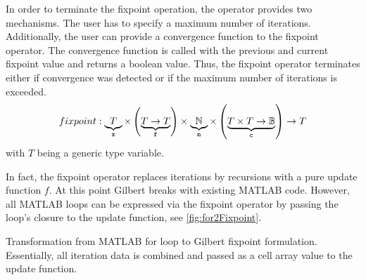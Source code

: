 In order to terminate the fixpoint operation, the operator provides two mechanisms.
The user has to specify a maximum number  of iterations.
Additionally, the user can provide a convergence function  to the fixpoint operator.
The convergence function is called with the previous and current fixpoint value and returns a boolean value.
Thus, the fixpoint operator terminates either if convergence was detected or if the maximum number of iterations is exceeded.
\small
\begin{equation}
\label{eq:fixpoint}
fixpoint: \underbrace{T}_{\text{\texttt{x}}} \times \left( \underbrace{T \rightarrow T}_{\text{\texttt{f}}} \right) \times \underbrace{\mathbb{N}}_{\text{\texttt{m}}} \times \left(\underbrace{T\times T \rightarrow \mathbb{B}}_{\text{\texttt{c}}} \right) \rightarrow T
\end{equation}
\normalsize
with $T$ being a generic type variable.

In fact, the fixpoint operator replaces iterations by recursions with a pure update function $f$. 
At this point Gilbert breaks with existing MATLAB code. 
However, all MATLAB loops can be expressed via the fixpoint operator by passing the loop's closure to the update function, see \cref{fig:for2Fixpoint}.
\begin{listing}[!h]
  \centering
  \caption{Transformation from MATLAB for loop  to Gilbert fixpoint  formulation. Essentially, all iteration data is combined and passed as a cell array value to the update function.}
  \label{fig:for2Fixpoint}
\end{listing}

